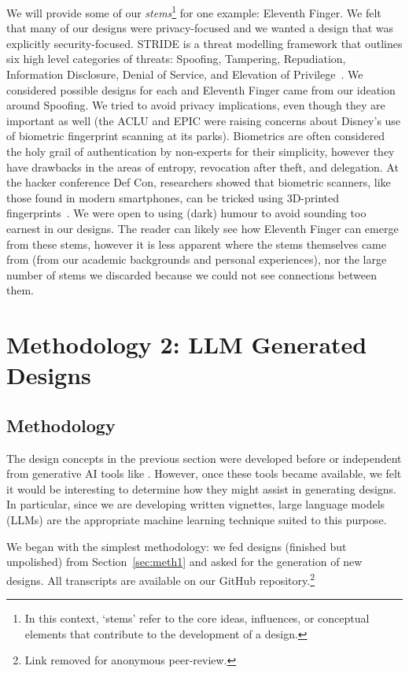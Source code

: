 We will provide some of our \textit{stems}\footnote{In this context, `stems' refer to the core ideas, influences, or conceptual elements that contribute to the development of a design.} for one example: Eleventh Finger.  We felt that many of our designs were privacy-focused and we wanted a design that was explicitly security-focused. STRIDE is a threat modelling framework that outlines six high level categories of threats: Spoofing, Tampering, Repudiation, Information Disclosure, Denial of Service, and Elevation of Privilege~\cite{shostack2014threat}. We considered possible designs for each and Eleventh Finger came from our ideation around Spoofing. We tried to avoid privacy implications, even though they are important as well (the ACLU and EPIC were raising concerns about Disney's use of biometric fingerprint scanning at its parks). Biometrics are often considered the holy grail of authentication by non-experts for their simplicity, however they have drawbacks in the areas of entropy, revocation after theft, and delegation. At the hacker conference Def Con, researchers showed that biometric scanners, like those found in modern smartphones, can be tricked using 3D-printed fingerprints~\cite{levalle2020biometric}. We were open to using (dark) humour to avoid sounding too earnest in our designs. The reader can likely see how Eleventh Finger can emerge from these stems, however it is less apparent where the stems themselves came from (\eg from our academic backgrounds and personal experiences), nor the large number of stems we discarded because we could not see connections between them. 

\section{Methodology 2: LLM Generated Designs}
\label{sec:meth2}

\subsection{Methodology}

The design concepts in the previous section were developed before or independent from generative AI tools like \gpt. However, once these tools became available, we felt it would be interesting to determine how they might assist in generating designs. In particular, since we are developing written vignettes, large language models (LLMs) are the appropriate machine learning technique suited to this purpose.

We began with the simplest methodology: we fed \gpt \gptv designs (finished but unpolished) from Section~\ref{sec:meth1} and asked for the generation of new designs. All transcripts are available on our GitHub repository.\footnote{Link removed for anonymous peer-review.}

